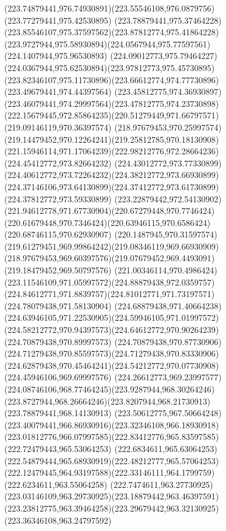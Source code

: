 {{  \curveto(223.74879441,976.74930891)(223.55546108,976.0879756)(223.77279441,975.42530895)
  \curveto(223.78879441,975.37464228)(223.85546107,975.37597562)(223.87812774,975.41864228)
  \curveto(223.9727944,975.58930894)(224.0567944,975.77597561)(224.1407944,975.96530893)
  \curveto(224.09012773,975.79464227)(224.0367944,975.62530894)(223.97812773,975.45730895)
  \curveto(223.82346107,975.11730896)(223.66612774,974.77730896)(223.49679441,974.44397564)
  \curveto(223.45812775,974.36930897)(223.46079441,974.29997564)(223.47812775,974.23730898)
  \curveto(222.15679445,972.85864235)(220.51279449,971.66797571)(219.09146119,970.36397574)
  \curveto(218.97679453,970.25997574)(219.14479452,970.12264241)(219.25812785,970.18130908)
  \curveto(221.15946114,971.17064239)(222.98212776,972.28664236)(224.45412772,973.82664232)
  \curveto(224.43012772,973.77330899)(224.40612772,973.72264232)(224.38212772,973.66930899)
  \curveto(224.37146106,973.64130899)(224.37412772,973.61730899)(224.37812772,973.59330899)
  \curveto(223.22879442,972.54130902)(221.94612778,971.67730904)(220.67279448,970.7746424)
  \curveto(220.61679448,970.7346424)(220.63946115,970.6586424)(220.68746115,970.62930907)
  \curveto(220.1487945,970.31597574)(219.61279451,969.99864242)(219.08346119,969.66930909)
  \curveto(218.97679453,969.60397576)(219.07679452,969.4493091)(219.18479452,969.50797576)
  \curveto(221.00346114,970.4986424)(223.11546109,971.05997572)(224.88879438,972.0359757)
  \curveto(224.84612771,971.8839757)(224.81012771,971.73197571)(224.78079438,971.58130904)
  \curveto(224.68879438,971.40664238)(224.63946105,971.22530905)(224.59946105,971.01997572)
  \curveto(224.58212772,970.94397573)(224.64612772,970.90264239)(224.70879438,970.89997573)
  \curveto(224.70879438,970.87730906)(224.71279438,970.85597573)(224.71279438,970.83330906)
  \curveto(224.62879438,970.45464241)(224.54212772,970.07730908)(224.45946106,969.69997576)
  \curveto(224.26612773,969.23997577)(224.08746106,968.77464245)(223.9287944,968.30264246)
  \curveto(223.8727944,968.26664246)(223.8207944,968.21730913)(223.78879441,968.14130913)
  \curveto(223.50612775,967.50664248)(223.40079441,966.86930916)(223.32346108,966.18930918)
  \curveto(223.01812776,966.07997585)(222.83412776,965.83597585)(222.72479443,965.53064253)
  \curveto(222.6834611,965.63064253)(222.54879444,965.68930919)(222.48212777,965.57064253)
  \curveto(222.12479445,964.93197588)(222.33146111,964.1799759)(222.6234611,963.55064258)
  \curveto(222.7474611,963.27730925)(223.03146109,963.29730925)(223.18879442,963.46397591)
  \curveto(223.23812775,963.39464258)(223.29679442,963.32130925)(223.36346108,963.24797592)
}}
